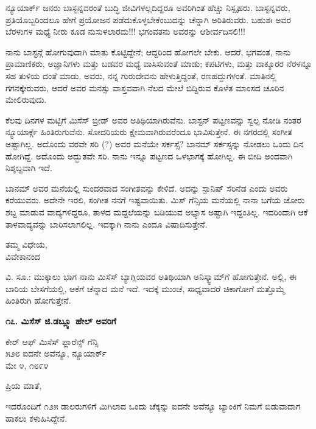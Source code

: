 ನ್ಯೂಯಾರ್ಕ್ ಜನರು ಬಾಸ್ಟನ್ನವರಂತೆ ಬುದ್ಧಿ ಜೀವಿಗಳಲ್ಲದಿದ್ದರೂ ಅವರಿಗಿಂತ ಹೆಚ್ಚು ನಿಸ್ಪೃಹರು. ಬಾಸ್ಟನ್ನವರು, ಪ್ರತಿಯೊಬ್ಬರಿಂದಲೂ ಹೇಗೆ ಪ್ರಯೋಜನ ಪಡೆದುಕೊಳ್ಳಬೇಕೆಂಬುದನ್ನು ಚೆನ್ನಾಗಿ ಅರಿತಿರುವರು. ಬಹುಶಃ ಅವರ ಬೆರಳುಗಳ ಮಧ್ಯೆ ನೀರು ಕೂಡ ನುಸುಳಲಾರದು!!! ಭಗಂವತನು ಅವರನ್ನು ಆಶೀರ್ವದಿಸಲಿ!!!

ನಾನು ಬಾಸ್ಟನ್ಗೆ ಹೋಗುವುದಾಗಿ ಮಾತು ಕೊಟ್ಟಿದ್ದೇನೆ; ಆದ್ದರಿಂದ ಹೋಗಲೇ ಬೇಕು. ಆದರೆ, ಭಗವಂತ, ನಾನು ಪ್ರಾಮಾಣಿಕರು, ಅಜ್ಞಾನಿಗಳು ಮತ್ತು ಬಡವರ ಮಧ್ಯೆ ವಾಸಿಸುವಂತೆ ಮಾಡು; ಕಪಟಿಗಳು, ಮತ್ತು ವಾಕ್ಶೂರರ ನೆರಳನ್ನೂ ಸಹ ತುಳಿಯ ದಂತೆ ಮಾಡು. ಅವರು, ನನ್ನ ಗುರುದೇವನು ಹೇಳುತ್ತಿದ್ದಂತೆ, ರಣಹದ್ದುಗಳಂತೆ. ಮಾತಿನಲ್ಲಿ ಗಗನಕ್ಕೇರುವರು, ಆದರೆ ಅವರ ಮನಸ್ಸು ವಾಸ್ತವವಾಗಿ ನೆಲದ ಮೇಲೆ ಬಿದ್ದಿರುವ ಕೊಳೆತ ಮಾಂಸದ ಚೂರಿನ ಮೇಲಿರುವುದು.

ಕೆಲವು ದಿನಗಳ ಮಟ್ಟಿಗೆ ಮಿಸೆಸ್ ಬ್ರೀಡ್ ಅವರ ಅತಿಥಿಯಾಗಿರುವೆನು. ಬಾಸ್ಟನ್ ಪಟ್ಟಣವನ್ನು ಸ್ವಲ್ಪ ನೋಡಿ ನಂತರ ನ್ಯೂಯಾರ್ಕ್ಗೆ ಹಿಂತಿರುಗುವೆನು. ಸೋದರಿಯರು ಕ್ಷೇಮವಾಗಿರುವರೆಂದೂ ಭಾವಿಸುತ್ತೇನೆ. ಈ ನಗರದಲ್ಲಿ ಸಂಗೀತ ಅಷ್ಟಾಗಿಲ್ಲ. ಅದೊಂದು ವರವೇ ಸರಿ (?) ಅವರ ಮನೆಯೇ ಸರ್ಕಸ್ಸೆ? ಬಾನಮ್​ ಸರ್ಕಸ್ಸನ್ನು ನೋಡಲು ಒಂದು ದಿನ ಹೋಗಿದ್ದೆ. ಅದೊಂದು ಅದ್ಭುತವೇ ಸರಿ. ನಾನು ಇನ್ನೂ ಪಟ್ಟಣದ ಒಳಭಾಗಕ್ಕೆ ಹೋಗಿಲ್ಲ. ಈ ಬೀದಿ ಅಂದವಾಗಿ ನಿಶ್ಶಬ್ದವಾಗಿ ಇದೆ.

ಬಾನಮ್​ ಅವರ ಮನೆಯಲ್ಲಿ ಸುಂದರವಾದ ಸಂಗೀತವನ್ನು ಕೇಳಿದೆ. ಅದನ್ನು ಸ್ಪಾನಿಷ್ ಸೆರಿನೆಡ ಎಂದು ಅವರು ಕರೆಯುವರು. ಅದೇನೇ ಇರಲಿ, ಸಂಗೀತ ನನಗೆ ಇಷ್ಟವಾಯಿತು. ಮಿಸ್ ಗೆನ್ಸಿಯ ಮನೆಯಲ್ಲಿ ನಾನಾ ಬಗೆಯ ಜೋರು ಶಬ್ದ ಮಾಡುವ ವಾದ್ಯಗಳಿದ್ದರೂ, ತಾಳದ ಮದ್ದಲೆಯನ್ನು ಬಡಿಯುವ ಅಭ್ಯಾಸ ಅಷ್ಟಾಗಿ ಇದ್ದಂತಿಲ್ಲ. ಇದರಿಂದಾಗಿ ಆಕೆ ತಾಳವಾದ್ಯವನ್ನು ಬಾರಿಸಲಾಗಲಿಲ್ಲ. ಇದಕ್ಕಾಗಿ ನಾನು ಎಂದೂ ವಿಷಾದಿಸುತ್ತೇನೆ.

\begin{flushright}
ತಮ್ಮ ವಿಧೇಯ,\\ವಿವೇಕಾನಂದ
\end{flushright}

ವಿ. ಸೂ.: ಮುಕ್ಕಾಲು ಭಾಗ ನಾನು ಮಿಸೆಸ್ ಬ್ಯಾಗ್ಲಿಯವರ ಅತಿಥಿಯಾಗಿ ಅನಿಸ್ಕ್ವಾಮ್​ಗೆ ಹೋಗುತ್ತೇನೆ. ಅಲ್ಲಿ, ಈ ಬಾರಿಯ ಬೇಸಗೆಯಲ್ಲಿ, ಆಕೆಗೆ ಚೆನ್ನಾದ ಮನೆ ಇದೆ. ಇದಕ್ಕೆ ಮುಂಚೆ, ಸಾಧ್ಯವಾದರೆ ಚಿಕಾಗೋಗೆ ಮತ್ತೊಮ್ಮೆ ಹಿಂತಿರುಗಿ ಹೋಗುತ್ತೇನೆ.

\begin{center}
\textbf{೧೭. ಮಿಸೆಸ್ ಜಿ.ಡಬ್ಲ್ಯೂ ಹೇಲ್ ಅವರಿಗೆ}
\end{center}

\begin{flushright}
ಕೇರ್ ಆಫ್ ಮಿಸೆಸ್ ಫ್ಲಾರೆನ್ಸ್ ಗೆನ್ಸಿ\\೫೨೮ ಐದನೇ ಅವೆನ್ಯೂ, ನ್ಯೂಯಾರ್ಕ್\\ಮೇ ೪, ೧೮೯೪
\end{flushright}

ಪ್ರಿಯ ಮಾತೆ,

ಇದರೊಂದಿಗೆ ೧೨೫ ಡಾಲರುಗಳಿಗೆ ಮಿಗಿಲಾದ ಒಂದು ಚೆಕ್ಕನ್ನು ಐದನೇ ಅವೆನ್ಯೂ ಬ್ಯಾಂಕಿಗೆ ನಿಮಗೆ ಬಿಡುವಾದಾಗ ಹಾಕಲು ಕಳುಹಿಸಿದ್ದೇನೆ.

